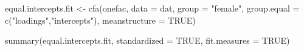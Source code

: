 \documentclass[
  letterpaper,
  DIV=11,
  numbers=noendperiod]{scrreprt}
\newenvironment{Shaded}{\begin{snugshade}}{\end{snugshade}}
\newcommand{\AttributeTok}[1]{\textcolor[rgb]{0.40,0.45,0.13}{#1}}
\newcommand{\ConstantTok}[1]{\textcolor[rgb]{0.56,0.35,0.01}{#1}}
\newcommand{\FunctionTok}[1]{\textcolor[rgb]{0.28,0.35,0.67}{#1}}
\newcommand{\NormalTok}[1]{\textcolor[rgb]{0.00,0.23,0.31}{#1}}
\newcommand{\OtherTok}[1]{\textcolor[rgb]{0.00,0.23,0.31}{#1}}
\newcommand{\StringTok}[1]{\textcolor[rgb]{0.13,0.47,0.30}{#1}}
\begin{document}
\begin{Shaded}
\begin{Highlighting}[]
\NormalTok{equal.intercepts.fit }\OtherTok{\textless{}{-}} \FunctionTok{cfa}\NormalTok{(onefac, }\AttributeTok{data =}\NormalTok{ dat, }\AttributeTok{group =} \StringTok{"female"}\NormalTok{, }
                            \AttributeTok{group.equal =} \FunctionTok{c}\NormalTok{(}\StringTok{"loadings"}\NormalTok{,}\StringTok{"intercepts"}\NormalTok{), }\AttributeTok{meanstructure =} \ConstantTok{TRUE}\NormalTok{)}

\FunctionTok{summary}\NormalTok{(equal.intercepts.fit, }\AttributeTok{standardized =} \ConstantTok{TRUE}\NormalTok{, }\AttributeTok{fit.measures =} \ConstantTok{TRUE}\NormalTok{)}
\end{Highlighting}
\end{Shaded}
\end{document}
